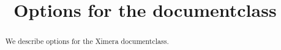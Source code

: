 \documentclass{ximera}
\title{Options for the documentclass}
\begin{document}
\begin{abstract}
  We describe options for the Ximera documentclass. 
\end{abstract}
\maketitle
\end{document}
